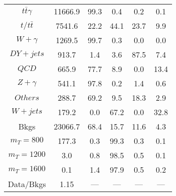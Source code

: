 \begin{figure}
\begin{minipage}[c]{0.32\textwidth}
{\begin{tabular}{cccccc}
$ t\bar{t}\gamma $ &  11666.9 &  99.3 &  0.4 &  0.2 &  0.1\\
$ t/t\bar{t} $ &  7541.6 &  22.2 &  44.1 &  23.7 &  9.9\\
$ W+\gamma $ &  1269.5 &  99.7 &  0.3 &  0.0 &  0.0\\
$ DY+jets $ &  913.7 &  1.4 &  3.6 &  87.5 &  7.4\\
$ QCD $ &  665.9 &  77.7 &  8.9 &  0.0 &  13.4\\
$ Z+\gamma $ &  541.1 &  97.8 &  0.2 &  1.4 &  0.6\\
$ Others $ &  288.7 &  69.2 &  9.5 &  18.3 &  2.9\\
$ W+jets $ &  179.2 &  0.0 &  67.2 &  0.0 &  32.8\\
Bkgs &  23066.7 &  68.4 &  15.7 &  11.6 &  4.3\\
$ m_{T} = 800 $ &  177.3 &  0.3 &  99.3 &  0.3 &  0.1\\
$ m_{T} = 1200 $ &  3.0 &  0.8 &  98.5 &  0.5 &  0.1\\
$ m_{T} = 1600 $ &  0.1 &  1.4 &  97.9 &  0.5 &  0.2\\
Data/Bkgs &  1.15 &  --- &  --- &  --- &  ---\\
\hline
\end{tabular}
}
\end{minipage}
\end{figure}

